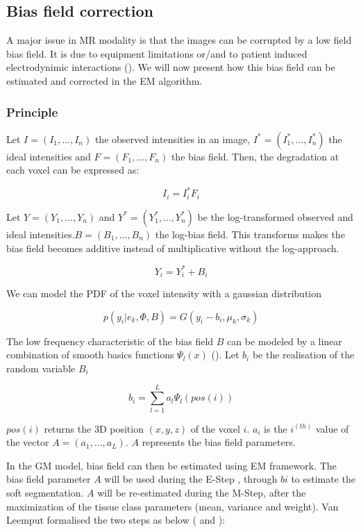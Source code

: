 \subsection{Bias field correction}\label{biasfield}
A major issue in MR modality is that the images can be corrupted by a low field bias field. It is due to equipment limitations or/and to patient induced electrodynimic interactions (\cite{12}). We will now present how this bias field can be estimated and corrected in the EM algorithm.
%
\subsubsection{Principle}
Let $I=(I_1, ..., I_n)$ the observed intensities in an image, $I^*=(I_1^*, ..., I_n^*)$ the ideal intensities and $F=(F_1, ..., F_n)$ the bias field. Then, the degradation at each voxel can be expressed as:

  \begin{equation*}
  I_i=I_i^*F_i
  \end{equation*}

Let $Y=(Y_1, ..., Y_n)$ and $Y^*=(Y_1^*, ..., Y_n^*)$ be the log-transformed observed and ideal intensities.$B=(B_1, ..., B_n)$ the log-bias field. This transforms makes the bias field becomes additive instead of multiplicative without the log-approach.

  \begin{equation*}
  Y_i=Y_i^* + B_i
  \end{equation*}
  
We can model the PDF of the voxel intensity with a gaussian distribution

 \begin{equation*}
  p(y_i|e_k, \Phi, B) = G(y_i-b_i,\mu_k,\sigma_k)
  \end{equation*}
  
The low frequency characteristic of the bias field $B$ can be modeled by a linear combination of smooth basics functions $\Psi_l(x)$ (\cite{13}). Let $b_i$ be the realisation of the random variable $B_i$ 

  \begin{equation*}
  b_i = \sum_{l=1}^L a_l\Psi_l(pos(i))
  \end{equation*}
  
 $pos(i)$ returns the 3D position $(x,y,z)$ of the voxel $i$. $a_i$ is the $i^{(th)}$ value of the vector $A=(a_1, ..., a_L)$. $A$ represents the bias field parameters.
 \par
In the GM model, bias field can then be estimated using EM framework. The bias field parameter $A$ will be used during the E-Step , through $bi$ to estimate the soft segmentation. $A$ will be re-estimated during the M-Step, after the maximization of the tissue class parameters (mean, variance and weight).
Van Leemput formalised the two steps as below (\cite{8} and \cite{9}):\\

